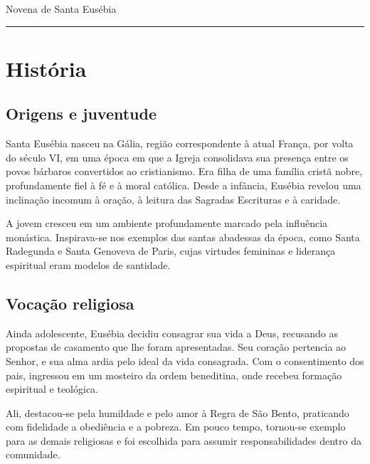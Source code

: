 \documentclass[a4paper,14pt]{extarticle} \usepackage[utf8]{inputenc}
\begin{document}


\begin{center}
  {\huge Novena de Santa Eusébia}
\end{center}



\noindent\rule{\textwidth}{0.4pt}

\tableofcontents

\thispagestyle{empty}


\newpage

\section{História}

\subsection{Origens e juventude}

Santa Eusébia nasceu na Gália, região correspondente à atual França, por volta do século VI, em uma época em que a Igreja consolidava sua presença entre os povos bárbaros convertidos ao cristianismo. Era filha de uma família cristã nobre, profundamente fiel à fé e à moral católica. Desde a infância, Eusébia revelou uma inclinação incomum à oração, à leitura das Sagradas Escrituras e à caridade.

A jovem cresceu em um ambiente profundamente marcado pela influência monástica. Inspirava-se nos exemplos das santas abadessas da época, como Santa Radegunda e Santa Genoveva de Paris, cujas virtudes femininas e liderança espiritual eram modelos de santidade.

\subsection{Vocação religiosa}

Ainda adolescente, Eusébia decidiu consagrar sua vida a Deus, recusando as propostas de casamento que lhe foram apresentadas. Seu coração pertencia ao Senhor, e sua alma ardia pelo ideal da vida consagrada. Com o consentimento dos pais, ingressou em um mosteiro da ordem beneditina, onde recebeu formação espiritual e teológica.

Ali, destacou-se pela humildade e pelo amor à Regra de São Bento, praticando com fidelidade a obediência e a pobreza. Em pouco tempo, tornou-se exemplo para as demais religiosas e foi escolhida para assumir responsabilidades dentro da comunidade.
\end{document}
